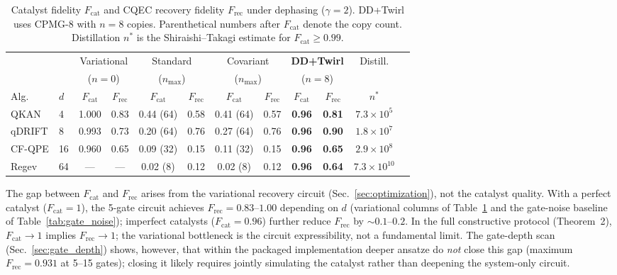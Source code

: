 \documentclass[a4paper,twocolumn]{quantumarticle}
\begin{document}
\begin{table}[t]
\caption{Catalyst fidelity $F_\mathrm{cat}$ and CQEC recovery fidelity $F_\mathrm{rec}$ under dephasing ($\gamma = 2$). DD+Twirl uses CPMG-8 with $n = 8$ copies. Parenthetical numbers after $F_\mathrm{cat}$ denote the copy count. Distillation $n^*$ is the Shiraishi--Takagi estimate for $F_\mathrm{cat} \geq 0.99$.}
\label{tab:unified_comparison}
\centering\footnotesize
\setlength{\tabcolsep}{4pt}
\begin{tabular}{@{}llcccccccccc@{}}
\toprule
& & \multicolumn{2}{c}{Variational} & \multicolumn{2}{c}{Standard} & \multicolumn{2}{c}{Covariant} & \multicolumn{2}{c}{\textbf{DD+Twirl}} & Distill. \\
& & \multicolumn{2}{c}{($n=0$)} & \multicolumn{2}{c}{($n_\mathrm{max}$)} & \multicolumn{2}{c}{($n_\mathrm{max}$)} & \multicolumn{2}{c}{($n=8$)} & \\
\cmidrule(r){3-4}\cmidrule(r){5-6}\cmidrule(r){7-8}\cmidrule(r){9-10}
Alg. & $d$ & $F_\mathrm{cat}$ & $F_\mathrm{rec}$ & $F_\mathrm{cat}$ & $F_\mathrm{rec}$ & $F_\mathrm{cat}$ & $F_\mathrm{rec}$ & $F_\mathrm{cat}$ & $F_\mathrm{rec}$ & $n^*$ \\
\midrule
QKAN   & 4  & 1.000 & 0.83 & 0.44 (64) & 0.58 & 0.41 (64) & 0.57 & \textbf{0.96} & \textbf{0.81} & $7.3{\times}10^5$ \\
qDRIFT & 8  & 0.993 & 0.73 & 0.20 (64) & 0.76 & 0.27 (64) & 0.76 & \textbf{0.96} & \textbf{0.90} & $1.8{\times}10^7$ \\
CF-QPE & 16 & 0.960 & 0.65 & 0.09 (32) & 0.15 & 0.11 (32) & 0.15 & \textbf{0.96} & \textbf{0.65} & $2.9{\times}10^8$ \\
Regev  & 64 & ---   & ---  & 0.02 (8)  & 0.12 & 0.02 (8)  & 0.12 & \textbf{0.96} & \textbf{0.64} & $7.3{\times}10^{10}$ \\
\bottomrule
\end{tabular}
\end{table}

The gap between $F_\mathrm{cat}$ and $F_\mathrm{rec}$ arises from the variational recovery circuit (Sec.~\ref{sec:optimization}), not the catalyst quality.
With a perfect catalyst ($F_\mathrm{cat} = 1$), the 5-gate circuit achieves $F_\mathrm{rec} = 0.83$--$1.00$ depending on $d$ (variational columns of Table~\ref{tab:unified_comparison} and the gate-noise baseline of Table~\ref{tab:gate_noise}); imperfect catalysts ($F_\mathrm{cat} = 0.96$) further reduce $F_\mathrm{rec}$ by $\sim\!0.1$--$0.2$.
In the full constructive protocol (Theorem~2), $F_\mathrm{cat} \to 1$ implies $F_\mathrm{rec} \to 1$; the variational bottleneck is the circuit expressibility, not a fundamental limit.
The gate-depth scan (Sec.~\ref{sec:gate_depth}) shows, however, that within the packaged implementation deeper ansatze do \emph{not} close this gap (maximum $F_\mathrm{rec} = 0.931$ at 5--15 gates); closing it likely requires jointly simulating the catalyst rather than deepening the system-only circuit.
\end{document}
